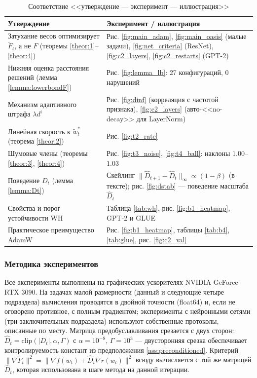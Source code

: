 \begin{table}[h!]
\centering
\caption{Соответствие <<утверждение --- эксперимент --- иллюстрация>>}
\label{tab:map}
\small
\setlength{\tabcolsep}{4pt}
\begin{tabular}{p{6.2cm}p{7.6cm}}
\toprule
Утверждение & Эксперимент / иллюстрация \\
\midrule
Затухание весов оптимизирует $\widetilde{F}_t$, а не $F$ (теоремы \ref{theor:1}--\ref{theor:4}) & Рис. \ref{fig:main_adam}, \ref{fig:main_oasis} (малые задачи), \ref{fig:net_criteria} (ResNet), \ref{fig:c2_layers}, \ref{fig:c2_restarts} (GPT-2) \\
Нижняя оценка расстояния решений (лемма \ref{lemma:lowerbondF}) & Рис. \ref{fig:lemma_lb}: 27 конфигураций, 0 нарушений \\
Механизм адаптивного штрафа $\lambda d^i$ & Рис. \ref{fig:dinf} (корреляция с частотой признака), \ref{fig:c2_layers} (авто-<<no-decay>> для LayerNorm) \\
Линейная скорость к $\widetilde{w}^*_t$ (теорема \ref{theor:2}) & Рис. \ref{fig:t2_rate} \\
Шумовые члены (теоремы \ref{theor:3}, \ref{theor:4}) & Рис. \ref{fig:t3_noise}, \ref{fig:t4_ball}: наклоны $1.00$--$1.03$ \\
Поведение $D_t$ (лемма \ref{lemma:Dt}) & Скейлинг $\|\hat D_{t+1}-\hat D_t\|_\infty \propto (1-\beta)$ (в тексте); рис. \ref{fig:dstab} --- поведение масштаба $\hat D_t$ \\
Свойства и порог устойчивости WH & Таблица \ref{tab:wh}, рис. \ref{fig:b1_heatmap}, GPT-2 и GLUE \\
Практическое преимущество AdamW & Рис. \ref{fig:b1_heatmap}, таблицы \ref{tab:b4}, \ref{tab:glue}, рис. \ref{fig:c2_val} \\
\bottomrule
\end{tabular}
\end{table}

\subsubsection{Методика экспериментов}

Все эксперименты выполнены на графических ускорителях NVIDIA GeForce RTX 3090. На задачах малой размерности (данный и следующие четыре подраздела) вычисления проводятся в двойной точности (float64) и, если не оговорено противное, с полным градиентом; эксперименты с нейронными сетями (три заключительных подраздела) используют собственные протоколы, описанные по месту. Матрица предобуславливания срезается с двух сторон: $\hat{D}_t = \mathrm{clip}(|D_t|, \alpha, \Gamma)$ с $\alpha = 10^{-8}$, $\Gamma = 10^3$ --- двусторонняя срезка обеспечивает контролируемость констант из предположения \ref{ass:preconditioned}. Критерий $\|\nabla \widetilde{F}_t\|^2 = \|\nabla f(w_t) + \hat{D}_t \nabla r(w_t)\|^2$ всюду вычисляется с той же матрицей $\hat{D}_t$, которая использована в шаге метода на данной итерации.

